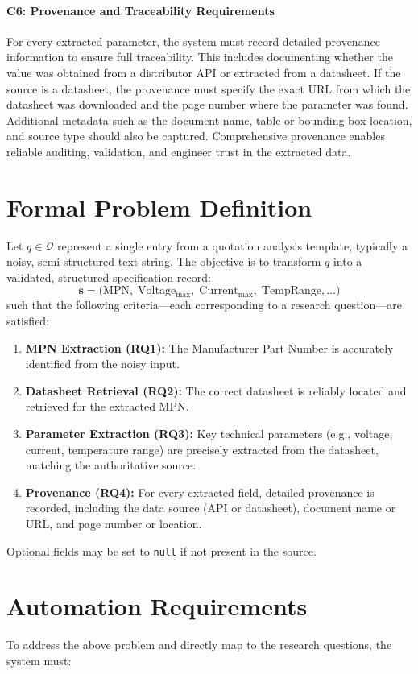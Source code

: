 \paragraph{C6: Provenance and Traceability Requirements}
For every extracted parameter, the system must record detailed provenance information to ensure full traceability. This includes documenting whether the value was obtained from a distributor API or extracted from a datasheet. If the source is a datasheet, the provenance must specify the exact URL from which the datasheet was downloaded and the page number where the parameter was found. Additional metadata such as the document name, table or bounding box location, and source type should also be captured. Comprehensive provenance enables reliable auditing, validation, and engineer trust in the extracted data.

\section{Formal Problem Definition}
Let $q \in \mathcal{Q}$ represent a single entry from a quotation analysis template, typically a noisy, semi-structured text string.  
The objective is to transform $q$ into a validated, structured specification record:
\[
\mathbf{s} = \bigl(\mathrm{MPN},\; \mathrm{Voltage_{max}},\; \mathrm{Current_{max}},\; \mathrm{TempRange}, \ldots\bigr)
\]
such that the following criteria—each corresponding to a research question—are satisfied:

\begin{enumerate}
  \item \textbf{MPN Extraction (RQ1):} The Manufacturer Part Number is accurately identified from the noisy input.
  \item \textbf{Datasheet Retrieval (RQ2):} The correct datasheet is reliably located and retrieved for the extracted MPN.
  \item \textbf{Parameter Extraction (RQ3):} Key technical parameters (e.g., voltage, current, temperature range) are precisely extracted from the datasheet, matching the authoritative source.
  \item \textbf{Provenance (RQ4):} For every extracted field, detailed provenance is recorded, including the data source (API or datasheet), document name or URL, and page number or location.
\end{enumerate}

Optional fields may be set to \texttt{null} if not present in the source.

\section{Automation Requirements}
To address the above problem and directly map to the research questions, the system must:

